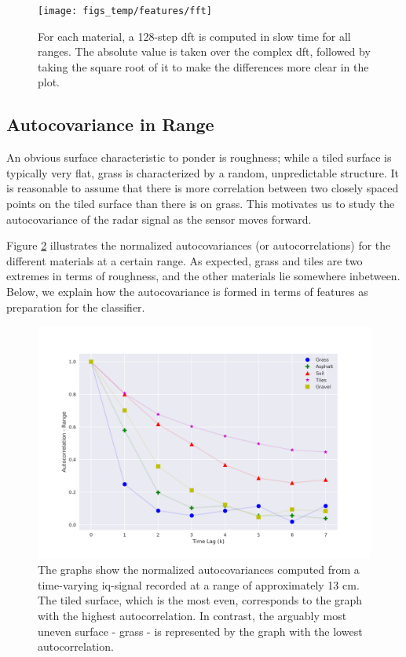 \begin{figure}[h]
	\centering
	\texttt{[image: figs\_temp/features/fft]}
	\caption{For each material, a 128-step \gls{dft} is computed in slow time for all ranges. The absolute value is taken over the complex \gls{dft}, followed by taking the square root of it to make the differences more clear in the plot. }
	\label{fig:fft}
\end{figure}


\subsection{Autocovariance in Range}
\label{ACr}
An obvious surface characteristic to ponder is roughness; while a tiled surface is typically very flat, grass is characterized by a random, unpredictable structure. It is reasonable to assume that there is more correlation between two closely spaced points on the tiled surface than there is on grass. This motivates us to study the autocovariance of the radar signal as the sensor moves forward.

Figure \ref{fig:autocorr_range} illustrates the normalized autocovariances (or autocorrelations) for the different materials at a certain range. As expected, grass and tiles are two extremes in terms of roughness, and the other materials lie somewhere inbetween. Below, we explain how the autocovariance is formed in terms of features as preparation for the classifier.

\begin{figure}[h]
	\centering
	\includegraphics[scale=0.45]{figs_temp/features/autocorr_range.png}
	\caption{The graphs show the normalized autocovariances computed from a time-varying \gls{iq}-signal recorded at a range of approximately 13 cm. The tiled surface, which is the most even, corresponds to the graph with the highest autocorrelation. In contrast, the arguably most uneven surface - grass - is represented by the graph with the lowest autocorrelation.}
	\label{fig:autocorr_range}
\end{figure}

